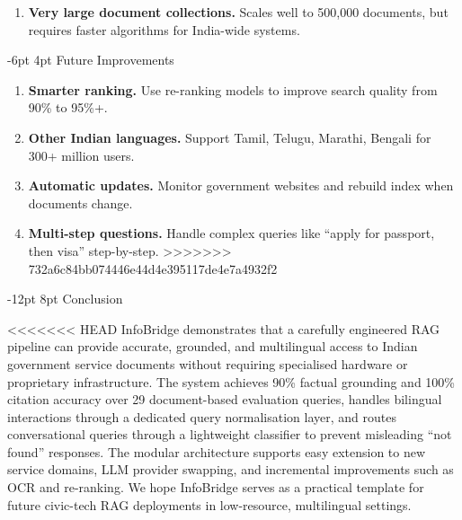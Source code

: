 \documentclass[10pt,twocolumn]{article}
\makeatletter
\renewcommand{\section}{\@startsection{section}{1}{\z@}%
  {-12pt \@plus -2pt \@minus -1pt}%
  {8pt \@plus 0.3pt}%
  {\normalfont\Large\bfseries}}
\renewcommand{\subsection}{\@startsection{subsection}{2}{\z@}%
  {-6pt \@plus -1pt \@minus -0.5pt}%
  {4pt \@plus 0.2pt}%
  {\normalfont\large\bfseries}}
\newcommand{\tightlist}{\setlength{\itemsep}{1pt}\setlength{\topsep}{2pt}\setlength{\parsep}{0pt}}
\makeatother
\begin{document}
\begin{enumerate}
\begin{enumerate}
  \item \textbf{Very large document collections.}  Scales well to 500,000 documents, but requires faster algorithms for India-wide systems.
\end{enumerate}

\subsection{Future Improvements}

\begin{enumerate}
  \tightlist
  \item \textbf{Smarter ranking.}  Use re-ranking models to improve search quality from 90\% to 95\%+.

  \item \textbf{Other Indian languages.}  Support Tamil, Telugu, Marathi, Bengali for 300+ million users.

  \item \textbf{Automatic updates.}  Monitor government websites and rebuild index when documents change.

  \item \textbf{Multi-step questions.}  Handle complex queries like ``apply for passport, then visa'' step-by-step.
>>>>>>> 732a6c84bb074446e44d4e395117de4e7a4932f2
\end{enumerate}

\section{Conclusion}

<<<<<<< HEAD
InfoBridge demonstrates that a carefully engineered RAG pipeline can provide accurate,
grounded, and multilingual access to Indian government service documents without
requiring specialised hardware or proprietary infrastructure.
The system achieves 90\% factual grounding and 100\% citation accuracy over 29
document-based evaluation queries, handles bilingual interactions through a dedicated
query normalisation layer, and routes conversational queries through a lightweight
classifier to prevent misleading ``not found'' responses.
The modular architecture supports easy extension to new service domains, LLM provider
swapping, and incremental improvements such as OCR and re-ranking.
We hope InfoBridge serves as a practical template for future civic-tech RAG deployments
in low-resource, multilingual settings.


\end{enumerate}
\end{document}
